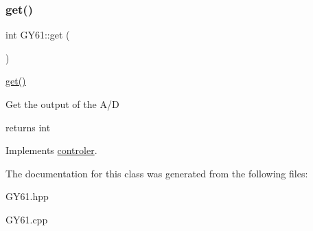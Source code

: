 \subsubsection{\texorpdfstring{get()}{get()}}
{\footnotesize\ttfamily int G\+Y61\+::get (\begin{DoxyParamCaption}{ }\end{DoxyParamCaption})\hspace{0.3cm}{\ttfamily [virtual]}}



\mbox{\hyperlink{class_g_y61_a3163809be7dd33dc0c46ba503b55394a}{get()}} 

Get the output of the A/D

returns int 

Implements \mbox{\hyperlink{classcontroler}{controler}}.



The documentation for this class was generated from the following files\+:\begin{DoxyCompactItemize}
\item 
G\+Y61.\+hpp\item 
G\+Y61.\+cpp\end{DoxyCompactItemize}
